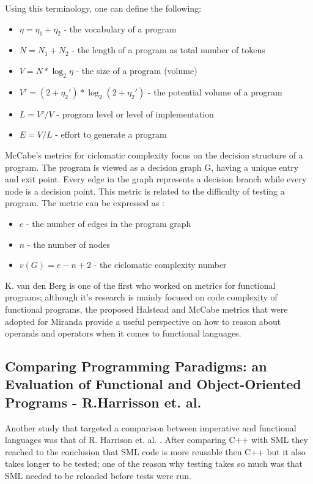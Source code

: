 \documentclass{article}
\begin{document}
Using this terminology, one can define the following:\par
\begin{itemize}
\item $\eta = \eta_1 + \eta_2 $ - the vocabulary of a program \par
\item $N = N_1 + N_2 $ - the length of a program as total number of tokens \par
\item $V = N * \log _2 \eta $ - the size of a program (volume) \par
\item $V' = (2 + \eta_2')*\log_2(2 + \eta_2')$ - the potential volume of a program \par
\item $L = V' / V $ - program level or level of implementation \par
\item $E = V / L $ - effort to generate a program
\end{itemize}

McCabe's metrics for ciclomatic complexity focus on the decision structure of a program. The program is viewed as a decision graph G, having a unique entry and exit point. Every edge in the graph represents a decision branch while every node is a decision point. This metric is related to the difficulty of testing a program. The metric can be expressed as :
\begin{itemize}
\item $e$ - the number of edges in the program graph \par
\item $n$ - the number of nodes \par
\item $v(G) = e - n + 2$ - the ciclomatic complexity number
\end{itemize}

K. van den Berg is one of the first who worked on metrics for functional programs; although it's research is mainly focused on code complexity of functional programs, the proposed Halstead and McCabe metrics that were adopted for Miranda provide a useful perspective on how to reason about operands and operators when it comes to functional languages. 

\subsection{Comparing Programming Paradigms: an Evaluation of Functional and Object-Oriented Programs - R.Harrisson et. al.}
Another study that targeted a comparison between imperative and functional languages was that of R. Harrison et. al. \cite{eps250597} . After comparing C++ with SML they reached to the conclusion that SML code is more reusable then C++ but it also takes longer to be tested; one of the reason why testing takes so much was that SML needed to be reloaded before tests were run. \par
\end{document}

